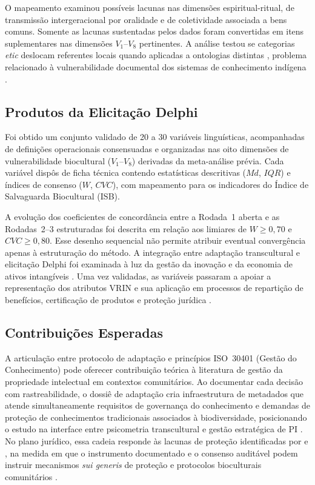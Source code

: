 \documentclass[preprint,authoryear,12pt]{elsarticle}
\begin{document}
O mapeamento examinou possíveis lacunas nas dimensões espiritual-ritual, de transmissão intergeracional por oralidade e de coletividade associada a bens comuns. Somente as lacunas sustentadas pelos dados foram convertidas em itens suplementares nas dimensões $V_1$--$V_8$ pertinentes. A análise testou se categorias \textit{etic} deslocam referentes locais quando aplicadas a ontologias distintas \citep{Herdman1999}, problema relacionado à vulnerabilidade documental dos sistemas de conhecimento indígena \citep{Maina2012,Balogun2021}.

\subsection{Produtos da Elicitação Delphi}

Foi obtido um conjunto validado de 20 a 30 variáveis linguísticas, acompanhadas de definições operacionais consensuadas e organizadas nas oito dimensões de vulnerabilidade biocultural ($V_1$--$V_8$) derivadas da meta-análise prévia. Cada variável dispôs de ficha técnica contendo estatísticas descritivas ($Md$, $IQR$) e índices de consenso ($W$, $CVC$), com mapeamento para os indicadores do Índice de Salvaguarda Biocultural (ISB).

A evolução dos coeficientes de concordância entre a Rodada~1 aberta e as Rodadas~2--3 estruturadas foi descrita em relação aos limiares de $W \geq 0,70$ e $CVC \geq 0,80$. Esse desenho sequencial não permite atribuir eventual convergência apenas à estruturação do método. A integração entre adaptação transcultural e elicitação Delphi foi examinada à luz da gestão da inovação \citep{Tidd2005} e da economia de ativos intangíveis \citep{Lev2001}. Uma vez validadas, as variáveis passaram a apoiar a representação dos atributos VRIN e sua aplicação em processos de repartição de benefícios, certificação de produtos e proteção jurídica \citep{Belletti2015}.

\subsection{Contribuições Esperadas}

A articulação entre protocolo de adaptação e princípios ISO~30401 (Gestão do Conhecimento) pode oferecer contribuição teórica à literatura de gestão da propriedade intelectual em contextos comunitários. Ao documentar cada decisão com rastreabilidade, o dossiê de adaptação cria infraestrutura de metadados que atende simultaneamente requisitos de governança do conhecimento \citep{ISO30401} e demandas de proteção de conhecimentos tradicionais associados à biodiversidade, posicionando o estudo na interface entre psicometria transcultural e gestão estratégica de PI \citep{Teece1986,ISO56005}. No plano jurídico, essa cadeia responde às lacunas de proteção identificadas por \citet{Dutfield2004} e \citet{Cottier2004}, na medida em que o instrumento documentado e o consenso auditável podem instruir mecanismos \textit{sui generis} de proteção e protocolos bioculturais comunitários \citep{BavikatteRobinson2011,Nemoga2022,Robinson2014}.
\end{document}
